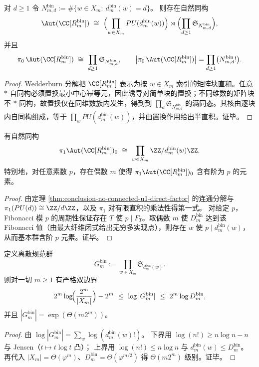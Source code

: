 \begin{proposition}\label{prop:conclusion-aut-components}
对 \(d\ge 1\) 令
\(
N_{m,d}^{\mathrm{bin}}:=\#\{w\in X_m:\ d_m^{\mathrm{bin}}(w)=d\}
\)。
则存在自然同构
\[
\Aut(\CC[R_m^{\mathrm{bin}}])
\ \cong\
\Bigl(\prod_{w\in X_m}PU(d_m^{\mathrm{bin}}(w))\Bigr)\rtimes
\Bigl(\prod_{d\ge 1}\mathfrak{S}_{N_{m,d}^{\mathrm{bin}}}\Bigr),
\]
并且
\[
\pi_0\,\Aut(\CC[R_m^{\mathrm{bin}}])
\ \cong\ \prod_{d\ge 1}\mathfrak{S}_{N_{m,d}^{\mathrm{bin}}},
\qquad
\bigl|\pi_0\,\Aut(\CC[R_m^{\mathrm{bin}}])\bigr|
=\prod_{d\ge 1} \bigl(N_{m,d}^{\mathrm{bin}}!\bigr).
\]
\end{proposition}
\begin{proof}
Wedderburn 分解把 \(\CC[R_m^{\mathrm{bin}}]\) 表示为按 \(w\in X_m\) 索引的矩阵块直和。任意 \(\ast\)-自同构必须置换最小中心幂等元，因此诱导对简单块的置换；不同维数的矩阵块不 \(\ast\)-同构，故置换仅在同维数族内发生，得到到 \(\prod_d\mathfrak S_{N_{m,d}^{\mathrm{bin}}}\) 的满同态。其核由逐块内自同构组成，等于 \(\prod_w PU(d_m^{\mathrm{bin}}(w))\)，并由置换作用给出半直积。证毕。
\end{proof}

\begin{proposition}[\(\pi_1\) 的循环分解与素数挠谱的遍在性]\label{prop:conclusion-pi1-all-primes}
有自然同构
\[
\pi_1\Aut(\CC[R_m^{\mathrm{bin}}])_0\ \cong\ \prod_{w\in X_m}\ZZ/d_m^{\mathrm{bin}}(w)\ZZ.
\]
特别地，对任意素数 \(p\)，存在偶数 \(m\) 使得 \(\pi_1\Aut(\CC[R_m^{\mathrm{bin}}])_0\) 含有阶为 \(p\) 的元素。
\end{proposition}
\begin{proof}
由定理 \ref{thm:conclusion-no-connected-u1-direct-factor} 的连通分解与 \(\pi_1(PU(d))\cong\ZZ/d\ZZ\)，以及 \(\pi_1\) 对有限直积的乘法性得第一式。
对给定 \(p\)，Fibonacci 模 \(p\) 的周期性保证存在 \(T\) 使 \(p\mid F_T\)。取偶数 \(m\) 使 \(D_m^{\mathrm{bin}}\) 达到该 Fibonacci 值（由最大纤维闭式给出无穷多实现点），则存在 \(w\) 使 \(p\mid d_m^{\mathrm{bin}}(w)\)，从而基本群含阶 \(p\) 元素。证毕。
\end{proof}

\begin{proposition}[纤维内置换的离散规范群与双指数阶]\label{prop:conclusion-discrete-gauge-double-exp}
定义离散规范群
\[
G_m^{\mathrm{bin}}:=\prod_{w\in X_m}\mathfrak S_{d_m^{\mathrm{bin}}(w)}.
\]
则对一切 \(m\ge 1\) 有严格双边界
\[
2^m\log\!\Bigl(\frac{2^m}{|X_m|}\Bigr)-2^m
\ \le\
\log|G_m^{\mathrm{bin}}|
\ \le\
2^m\log D_m^{\mathrm{bin}},
\]
并且 \(|G_m^{\mathrm{bin}}|=\exp(\Theta(m2^m))\)。
\end{proposition}
\begin{proof}
由 \(\log|G_m^{\mathrm{bin}}|=\sum_{w}\log(d_m^{\mathrm{bin}}(w)!)\)。
下界用 \(\log(n!)\ge n\log n-n\) 与 Jensen（\(t\mapsto t\log t\) 凸）；
上界用 \(\log(n!)\le n\log n\) 与 \(d_m^{\mathrm{bin}}(w)\le D_m^{\mathrm{bin}}\)。
再代入 \(|X_m|=\Theta(\varphi^m)\)、\(D_m^{\mathrm{bin}}=\Theta(\varphi^{m/2})\) 得 \(\Theta(m2^m)\) 级别。证毕。
\end{proof}

